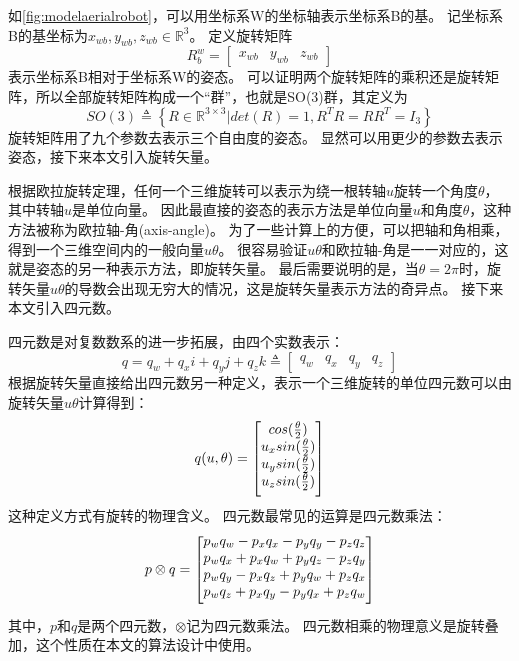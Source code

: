 \documentclass[
  type=master
]{gdutthesis}
\begin{document}
如\autoref{fig:modelaerialrobot}，可以用坐标系W的坐标轴表示坐标系B的基。
记坐标系B的基坐标为$x_{wb}, y_{wb}, z_{wb} \in \mathbb{R}^3$。
定义旋转矩阵
\begin{equation}\label{eq:rotationmatrixdefinition}
	R_b^w = 
	\begin{bmatrix}
		x_{wb} & y_{wb} & z_{wb}
	\end{bmatrix}
\end{equation}
表示坐标系B相对于坐标系W的姿态。
可以证明两个旋转矩阵的乘积还是旋转矩阵，所以全部旋转矩阵构成一个“群”，也就是SO(3)群，其定义为
\begin{equation}\label{eq:so3}
	SO(3) \triangleq \left\{ R \in \mathbb{R}^{3 \times 3} | det(R) = 1, R^T R = R R^T = I_3 \right\}
\end{equation}
旋转矩阵用了九个参数去表示三个自由度的姿态。
显然可以用更少的参数去表示姿态，接下来本文引入旋转矢量。

根据欧拉旋转定理，任何一个三维旋转可以表示为绕一根转轴$u$旋转一个角度$\theta$，其中转轴$u$是单位向量\cite{palais2007euler}。
因此最直接的姿态的表示方法是单位向量$u$和角度$\theta$，这种方法被称为欧拉轴-角(axis-angle)。
为了一些计算上的方便，可以把轴和角相乘，得到一个三维空间内的一般向量$u\theta$。
很容易验证$u\theta$和欧拉轴-角是一一对应的，这就是姿态的另一种表示方法，即旋转矢量。
最后需要说明的是，当$\theta = 2\pi$时，旋转矢量$u\theta$的导数会出现无穷大的情况，这是旋转矢量表示方法的奇异点。
接下来本文引入四元数。

四元数是对复数数系的进一步拓展，由四个实数表示：
\begin{equation}\label{eq:quatdef1}
	q = q_w + q_x i + q_y j + q_z k \triangleq 
	\begin{bmatrix}
		q_w & q_x & q_y & q_z
	\end{bmatrix}
\end{equation}
根据旋转矢量直接给出四元数另一种定义，表示一个三维旋转的单位四元数可以由旋转矢量$u\theta$计算得到：
\begin{equation}\label{eq:quatdef}
	q(u,\theta) = 
	\begin{bmatrix}
		cos(\frac{\theta}{2}) \\
		u_x sin(\frac{\theta}{2}) \\
		u_y sin(\frac{\theta}{2}) \\
		u_z sin(\frac{\theta}{2})\vspace{1ex}
	\end{bmatrix}	
\end{equation}
\vspace{1ex}这种定义方式有旋转的物理含义。
四元数最常见的运算是四元数乘法：
\begin{equation}
	p \otimes q = 
	\begin{bmatrix}
		p_w q_w - p_x q_x - p_y q_y - p_z q_z \\
		p_w q_x + p_x q_w + p_y q_z - p_z q_y \\
		p_w q_y - p_x q_z + p_y q_w + p_z q_x \\
		p_w q_z + p_x q_y - p_y q_x + p_z q_w \vspace{1ex}
	\end{bmatrix}	
\end{equation}
其中，$p$和$q$是两个四元数，$\otimes$记为四元数乘法。
四元数相乘的物理意义是旋转叠加，这个性质在本文的算法设计中使用。
\end{document}
